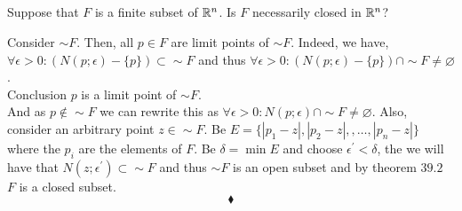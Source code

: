 \renewcommand{\thesubsection}{\thesection.\arabic{subsection}}
\setcounter{subsection}{0}

\subsection{}
\begin{tcolorbox}
Suppose that $F$ is a finite subset of $\mathbb{R}^n$. Is $F$ necessarily closed in $\mathbb{R}^n$?
\end{tcolorbox}
Consider $\sim F$. Then, all $p\in F$ are limit points of $\sim F$. Indeed, we have, $\forall \epsilon>0: \left(N(p;\epsilon)-\{p\}\right)\subset \sim F$ and thus $\forall \epsilon>0: \left(N(p;\epsilon)-\{p\}\right)\cap \sim F\neq \varnothing$.\\ Conclusion $p$ is a limit point of $\sim F$. \\
And as $p\not\in \sim F$ we can rewrite this as $\forall \epsilon>0: N(p;\epsilon)\cap \sim F\neq \varnothing$. Also, consider an arbitrary point $z\in\sim F$. Be $E=\{|p_1-z|,|p_2-z|,,\dots, |p_n-z|\}$ where the $p_i$ are the elements of $F$. Be $\delta = \min E$ and choose $\epsilon^{'} < \delta$, the we will have that $N(z;\epsilon^{'})\subset \sim F$ and thus $\sim F$ is an open subset and by theorem $\mathbf{39.2}$ $F$ is a closed subset.
$$\blacklozenge$$\\


